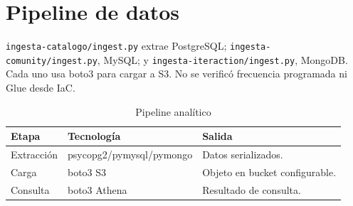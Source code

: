 \chapter{Pipeline de datos}\texttt{ingesta-catalogo/ingest.py} extrae PostgreSQL; \texttt{ingesta-comunity/ingest.py}, MySQL; y \texttt{ingesta-iteraction/ingest.py}, MongoDB. Cada uno usa boto3 para cargar a S3. No se verificó frecuencia programada ni Glue desde IaC.\begin{table}[H]\centering\caption{Pipeline analítico}\begin{tabularx}{\textwidth}{lXX}\toprule Etapa&Tecnología&Salida\\\midrule Extracción&psycopg2/pymysql/pymongo&Datos serializados.\\Carga&boto3 S3&Objeto en bucket configurable.\\Consulta&boto3 Athena&Resultado de consulta.\\\bottomrule\end{tabularx}\end{table}
